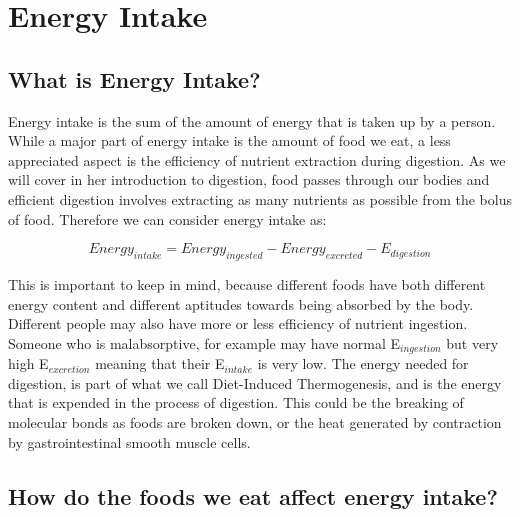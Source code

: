 \documentclass{tufte-handout}
\begin{document}
\section{Energy Intake}

\subsection{What is Energy Intake?}
Energy intake is the sum of the amount of energy that is taken up by a person.  While a major part of energy intake is the amount of food we eat, a less appreciated aspect is the efficiency of nutrient extraction during digestion.  As we will cover in her introduction to digestion, food passes through our bodies and efficient digestion involves extracting as many nutrients as possible from the bolus of food.  Therefore we can consider energy intake as:

\begin{equation}
Energy_{intake} = Energy_{ingested} - Energy_{excreted} - E_{digestion}
\end{equation}

This is important to keep in mind, because different foods have both different energy content and different aptitudes towards being absorbed by the body.  Different people may also have more or less efficiency of nutrient ingestion.  Someone who is malabsorptive, for example may have normal E$_{ingestion}$ but very high E$_{excretion}$ meaning that their E$_{intake}$ is very low.  The energy needed for digestion, is part of what we call Diet-Induced Thermogenesis, and is the energy that is expended in the process of digestion.  This could be the breaking of molecular bonds as foods are broken down, or the heat generated by contraction by gastrointestinal smooth muscle cells.

\subsection{How do the foods we eat affect energy intake?}
\end{document}
